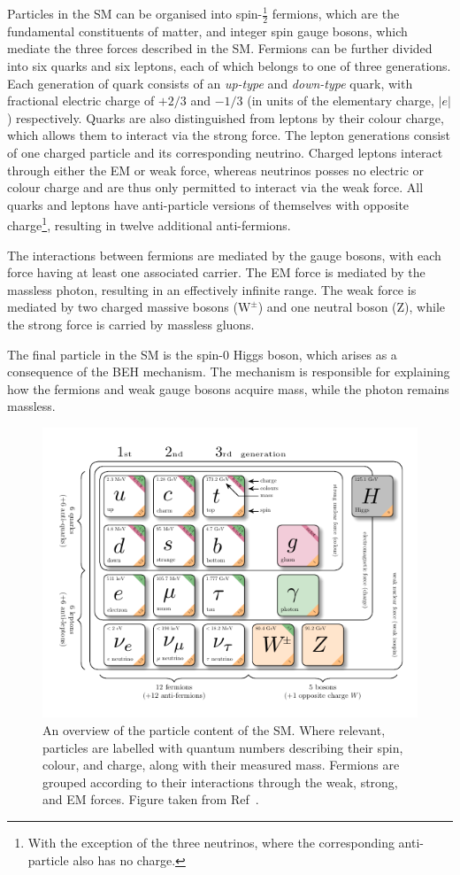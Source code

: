 Particles in the SM can be organised into spin-${\frac{1}{2}}$ fermions, which are the fundamental constituents of matter, and integer spin gauge bosons, which mediate the three forces described in the SM. Fermions can be further divided into six quarks and six leptons, each of which belongs to one of three generations. Each generation of quark consists of an \textit{up-type} and \textit{down-type} quark, with fractional electric charge of ${+2/3}$ and ${-1/3}$ (in units of the elementary charge, ${|e|}$) respectively. Quarks are also distinguished from leptons by their colour charge, which allows them to interact via the strong force. The lepton generations consist of one charged particle and its corresponding neutrino. Charged leptons interact through either the EM or weak force, whereas neutrinos posses no electric or colour charge and are thus only permitted to interact via the weak force. All quarks and leptons have anti-particle versions of themselves with opposite charge\footnote{With the exception of the three neutrinos, where the corresponding anti-particle also has no charge.}, resulting in twelve additional anti-fermions. %

The interactions between fermions are mediated by the gauge bosons, with each force having at least one associated carrier. The EM force is mediated by the massless photon, resulting in an effectively infinite range. The weak force is mediated by two charged massive bosons (${\mathrm{W}^{\pm}}$) and one neutral boson (${\mathrm{Z}}$), while the strong force is carried by massless gluons. 

The final particle in the SM is the spin-0 Higgs boson, which arises as a consequence of the BEH mechanism. The mechanism is responsible for explaining how the fermions and weak gauge bosons acquire mass, while the photon remains massless. 

\begin{figure}[htbp!]
\centering
\includegraphics[width =0.85\linewidth]{Figures/Theory/standard_model.pdf}\hfill
\caption[The particle content of the SM.]{An overview of the particle content of the SM. Where relevant, particles are labelled with quantum numbers describing their spin, colour, and charge, along with their measured mass. Fermions are grouped according to their interactions through the weak, strong, and EM forces. Figure taken from Ref~\cite{shane_thesis}.}
\label{fig:the_sm}
\end{figure}

